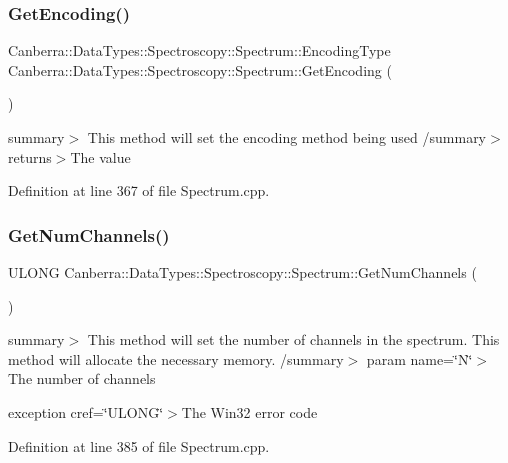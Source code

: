 \subsubsection{\texorpdfstring{Get\+Encoding()}{GetEncoding()}}
{\footnotesize\ttfamily Canberra\+::\+Data\+Types\+::\+Spectroscopy\+::\+Spectrum\+::\+Encoding\+Type Canberra\+::\+Data\+Types\+::\+Spectroscopy\+::\+Spectrum\+::\+Get\+Encoding (\begin{DoxyParamCaption}{ }\end{DoxyParamCaption})}

summary$>$ This method will set the encoding method being used /summary$>$ returns$>$The value

Definition at line 367 of file Spectrum.\+cpp.

\mbox{\label{class_canberra_1_1_data_types_1_1_spectroscopy_1_1_spectrum_a426538cdb01433c840f12add63922bd9_a426538cdb01433c840f12add63922bd9}} 
\subsubsection{\texorpdfstring{Get\+Num\+Channels()}{GetNumChannels()}}
{\footnotesize\ttfamily U\+L\+O\+NG Canberra\+::\+Data\+Types\+::\+Spectroscopy\+::\+Spectrum\+::\+Get\+Num\+Channels (\begin{DoxyParamCaption}{ }\end{DoxyParamCaption})}

summary$>$ This method will set the number of channels in the spectrum. This method will allocate the necessary memory. /summary$>$ param name=\char`\"{}\+N\char`\"{}$>$The number of channels

exception cref=\char`\"{}\+U\+L\+O\+N\+G\char`\"{}$>$The Win32 error code

Definition at line 385 of file Spectrum.\+cpp.

\mbox{\label{class_canberra_1_1_data_types_1_1_spectroscopy_1_1_spectrum_a0e240aba7a870edd64b75329bf7ff628_a0e240aba7a870edd64b75329bf7ff628}} 
